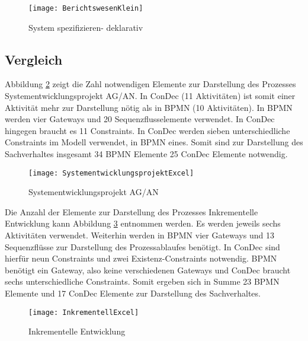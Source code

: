 \begin{figure}[!htbp]
\begin{center}
  \texttt{[image: BerichtswesenKlein]} %
  \caption{System spezifizieren- deklarativ}
  \label{fig:BerichtswesenKlein}
\end{center}
\end{figure}

\clearpage

\subsection{Vergleich}


Abbildung \ref{fig:SystementwicklungsprojektExcel} zeigt die Zahl notwendigen Elemente zur Darstellung des Prozesses Systementwicklungsprojekt AG/AN. In ConDec (11 Aktivitäten)  ist somit einer Aktivität mehr zur Darstellung nötig als in BPMN (10 Aktivitäten). In BPMN werden vier Gateways und 20 Sequenzflusselemente verwendet. In ConDec hingegen braucht es 11 Constraints. In ConDec werden sieben unterschiedliche Constraints im Modell verwendet, in BPMN eines. Somit sind zur Darstellung des Sachverhaltes insgesamt 34 BPMN Elemente 25 ConDec Elemente notwendig.\newline

\begin{figure}[!htbp]
\begin{center}
  \texttt{[image: SystementwicklungsprojektExcel]} %
  \caption{Systementwicklungsprojekt AG/AN}
  \label{fig:SystementwicklungsprojektExcel}
\end{center}
\end{figure}

Die Anzahl der Elemente zur Darstellung des Prozesses Inkrementelle Entwicklung kann Abbildung \ref{fig:InkrementellExcel} entnommen werden. Es werden jeweils sechs Aktivitäten verwendet. Weiterhin werden in BPMN vier Gateways und 13 Sequenzflüsse zur Darstellung des Prozessablaufes benötigt. In ConDec sind hierfür neun Constraints und zwei Existenz-Constraints notwendig. BPMN benötigt ein Gateway, also keine verschiedenen Gateways und ConDec braucht sechs unterschiedliche Constraints. Somit ergeben sich in Summe 23 BPMN Elemente und 17 ConDec Elemente zur Darstellung des Sachverhaltes. \newline

\begin{figure}[!htbp]
\begin{center}
  \texttt{[image: InkrementellExcel]} %
  \caption{Inkrementelle Entwicklung}
  \label{fig:InkrementellExcel}
\end{center}
\end{figure}

